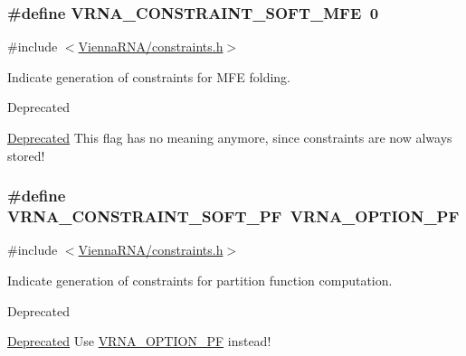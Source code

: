 \subsubsection[{\texorpdfstring{V\+R\+N\+A\+\_\+\+C\+O\+N\+S\+T\+R\+A\+I\+N\+T\+\_\+\+S\+O\+F\+T\+\_\+\+M\+FE}{VRNA_CONSTRAINT_SOFT_MFE}}]{\setlength{\rightskip}{0pt plus 5cm}\#define V\+R\+N\+A\+\_\+\+C\+O\+N\+S\+T\+R\+A\+I\+N\+T\+\_\+\+S\+O\+F\+T\+\_\+\+M\+FE~0}\hypertarget{group__constraints_ga62aa195893d02d1a79ca94952748df36}{}\label{group__constraints_ga62aa195893d02d1a79ca94952748df36}


{\ttfamily \#include $<$\hyperlink{constraints_8h}{Vienna\+R\+N\+A/constraints.\+h}$>$}



Indicate generation of constraints for M\+FE folding. 

\begin{DoxyRefDesc}{Deprecated}
\item[\hyperlink{deprecated__deprecated000040}{Deprecated}]This flag has no meaning anymore, since constraints are now always stored!\end{DoxyRefDesc}
\subsubsection[{\texorpdfstring{V\+R\+N\+A\+\_\+\+C\+O\+N\+S\+T\+R\+A\+I\+N\+T\+\_\+\+S\+O\+F\+T\+\_\+\+PF}{VRNA_CONSTRAINT_SOFT_PF}}]{\setlength{\rightskip}{0pt plus 5cm}\#define V\+R\+N\+A\+\_\+\+C\+O\+N\+S\+T\+R\+A\+I\+N\+T\+\_\+\+S\+O\+F\+T\+\_\+\+PF~{\bf V\+R\+N\+A\+\_\+\+O\+P\+T\+I\+O\+N\+\_\+\+PF}}\hypertarget{group__constraints_ga03fb5000c19b9a2082bf4ea30a543045}{}\label{group__constraints_ga03fb5000c19b9a2082bf4ea30a543045}


{\ttfamily \#include $<$\hyperlink{constraints_8h}{Vienna\+R\+N\+A/constraints.\+h}$>$}



Indicate generation of constraints for partition function computation. 

\begin{DoxyRefDesc}{Deprecated}
\item[\hyperlink{deprecated__deprecated000041}{Deprecated}]Use \hyperlink{group__fold__compound_gabfbadcddda3e74ce7f49035ef8f058f7}{V\+R\+N\+A\+\_\+\+O\+P\+T\+I\+O\+N\+\_\+\+PF} instead!\end{DoxyRefDesc}

